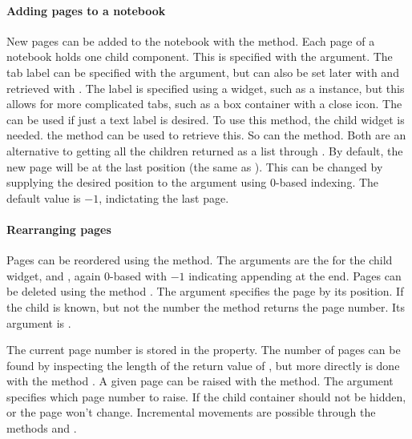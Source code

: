 \paragraph{Adding pages to a notebook}
New pages can be added to the notebook with the
 method. Each page of a notebook holds
one child component. This is specified with the
 argument. The tab label can be
specified with the 
argument, but can also be set later with
 and retrieved with
. The label is specified using a
widget, such as a  instance, but this allows for
more complicated tabs, such as a box container with a close icon. The
 can be used if just a text label
is desired. To use this method, the child widget is needed. the
\method{[[}{GObject}
 method can be used to retrieve this. So can the
 method. Both are an alternative to
getting all the children returned as a list through
. By default, the new page will be at
the last position (the same as ). This
can be changed by supplying the desired position to the argument
 using $0$-based indexing.
The default value is $-1$, indictating the last page.


\paragraph{Rearranging pages}
Pages can be reordered using the 
method. The arguments are the  for the
child widget, and , again 0-based with
$-1$ indicating appending at the end. Pages can be deleted using the
method . The
 argument specifies the page
by its position. If the child is known, but not the number the method
 returns the page number. Its argument is .

The current page number is stored in the  property.
The number of pages can be found by inspecting the length of the
return value of , but more directly
is done with the method . A given page
can be raised with the 
method. The argument 
specifies which page number to raise. If the child container should
not be hidden, or the page won't change. Incremental movements are
possible through the methods  and
. 

